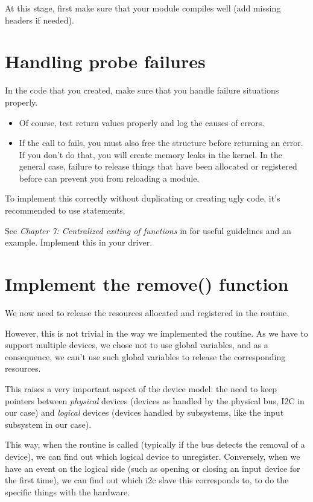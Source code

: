 At this stage, first make sure that your module compiles well (add
missing headers if needed).

\section{Handling probe failures}

In the code that you created, make sure that you handle failure
situations properly.

\begin{itemize}
\item Of course, test return values properly and log
      the causes of errors.
\item If the call to  fails,
      you must also free the  structure
      before returning an error. If you don't do that, you will create
      memory leaks in the kernel. In the general case, failure to
      release things that have been allocated or registered before
      can prevent you from reloading a module.
\end{itemize}

To implement this correctly without duplicating or creating ugly code,
it's recommended to use  statements.

See {\em Chapter 7: Centralized exiting of functions} in
 for useful guidelines and an example.
Implement this in your driver.

\section{Implement the remove() function}

We now need to release the resources allocated and registered in the
 routine.

However, this is not trivial in the way we implemented the
 routine. As we have to support multiple devices, we chose
not to use global variables, and as a consequence, we can't use such
global variables to release the corresponding resources.

This raises a very important aspect of the device model: the need to
keep pointers between {\em physical} devices (devices as handled by the
physical bus, I2C in our case) and {\em logical} devices (devices handled by subsystems,
like the input subsystem in our case).

This way, when the  routine is called (typically if the
bus detects the removal of a device), we can find out which logical
device to unregister. Conversely, when we have an event on the logical
side (such as opening or closing an input device for the first time),
we can find out which i2c slave this corresponds to, to do the specific
things with the hardware.

